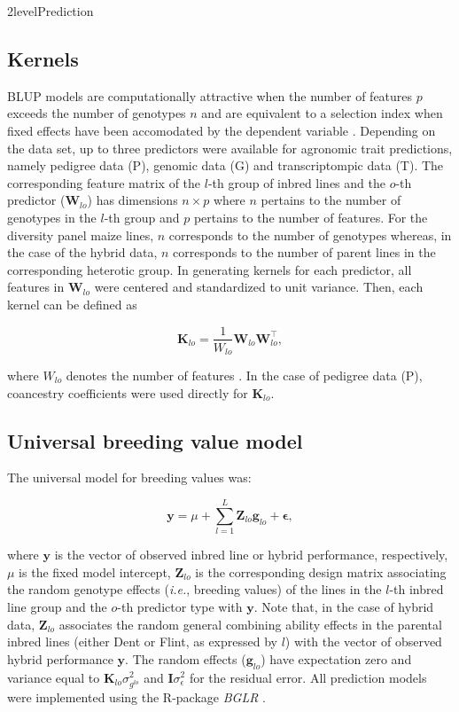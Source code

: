 \documentclass[12pt,titlepage]{article}
\begin{document}
\Genetics2level{Prediction}
\subsection{Kernels}
BLUP models are computationally attractive when the number of features $p$
exceeds the number of genotypes $n$ and are equivalent to a selection index
when fixed effects have been accomodated by the dependent variable 
\cite{Mrode2014}.
Depending on the data set, up to three predictors were available for agronomic
trait predictions, namely pedigree data (P), genomic data (G) and
transcriptompic data (T).
The corresponding feature matrix of the $l$-th group of inbred lines and the 
$o$-th predictor ($\mathbf{W}_{lo}$) has dimensions $n \times p$ where $n$
pertains to the number of genotypes in the $l$-th group and $p$ pertains to 
the number of features.
For the diversity panel maize lines, $n$ corresponds to the number of genotypes
whereas, in the case of the hybrid data, $n$ corresponds to the number of
parent lines in the corresponding heterotic group.
In generating kernels for each predictor, all features in $\mathbf{W}_{lo}$ were
centered and standardized to unit variance.
Then, each kernel can be defined as

\begin{equation} \label{eq:GenomicRelationship}
  \mathbf{K}_{lo} = \frac{1}{W_{lo}} \mathbf{W}_{lo} \mathbf{W}_{lo}^{\top},
\end{equation}

where $W_{lo}$ denotes the number of features \cite{VanRaden2008}.
In the case of pedigree data (P), coancestry coefficients were used directly
for $\mathbf{K}_{lo}$.





\subsection{Universal breeding value model}
The universal model for breeding values was:

\begin{equation} \label{eq:KBLUPModel}
  \mathbf{y} = \mu + 
  \sum_{l=1}^{L} \mathbf{Z}_{lo} \mathbf{g}_{lo} +
  \mathbf{\epsilon},
\end{equation}


where $\mathbf{y}$ is the vector of observed inbred line or hybrid performance,
respectively, $\mu$ is the fixed model intercept, $\mathbf{Z}_{lo}$ is the 
corresponding design matrix associating the random genotype effects 
(\textit{i.e.}, breeding values) of the lines in the $l$-th inbred line group 
and the $o$-th predictor type with $\mathbf{y}$.
Note that, in the case of hybrid data, $\mathbf{Z}_{lo}$ associates the random
general combining ability effects in the parental inbred lines (either Dent or
Flint, as expressed by $l$) with the vector of observed hybrid performance
$\mathbf{y}$.
The random effects ($\mathbf{g}_{lo}$) have expectation zero and variance equal 
to $\mathbf{K}_{lo} \sigma^{2}_{{g}^{lo}}$ and $\mathbf{I} \sigma^2_{\epsilon}$ 
for the residual error.
All prediction models were implemented using the R-package \textit{BGLR}
\cite{Perez2014}. 
\end{document}
